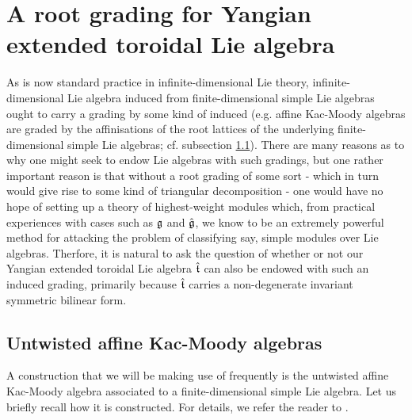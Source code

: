 \section{A root grading for Yangian extended toroidal Lie algebra} \label{section: root_grading_for_yangian_EALAs}
    As is now standard practice in infinite-dimensional Lie theory, infinite-dimensional Lie algebra induced from finite-dimensional simple Lie algebras ought to carry a grading by some kind of induced  (e.g. affine Kac-Moody algebras are graded by the affinisations of the root lattices of the underlying finite-dimensional simple Lie algebras; cf. subsection \ref{subsection: a_fixed_untwisted_affine_kac_moody_algebra}). There are many reasons as to why one might seek to endow Lie algebras with such gradings, but one rather important reason is that without a root grading of some sort - which in turn would give rise to some kind of triangular decomposition - one would have no hope of setting up a theory of highest-weight modules which, from practical experiences with cases such as $\mathfrak{g}$ and $\hat{\mathfrak{g}}$, we know to be an extremely powerful method for attacking the problem of classifying say, simple modules over Lie algebras. Therfore, it is natural to ask the question of whether or not our Yangian extended toroidal Lie algebra $\hat{\mathfrak{t}}$ can also be endowed with such an induced grading, primarily because $\hat{\mathfrak{t}}$ carries a non-degenerate invariant symmetric bilinear form.

    \subsection{Untwisted affine Kac-Moody algebras} \label{subsection: a_fixed_untwisted_affine_kac_moody_algebra}
        A construction that we will be making use of frequently is the untwisted affine Kac-Moody algebra associated to a finite-dimensional simple Lie algebra. Let us briefly recall how it is constructed. For details, we refer the reader to \cite[Chapters 6 and 7]{kac_infinite_dimensional_lie_algebras}.

